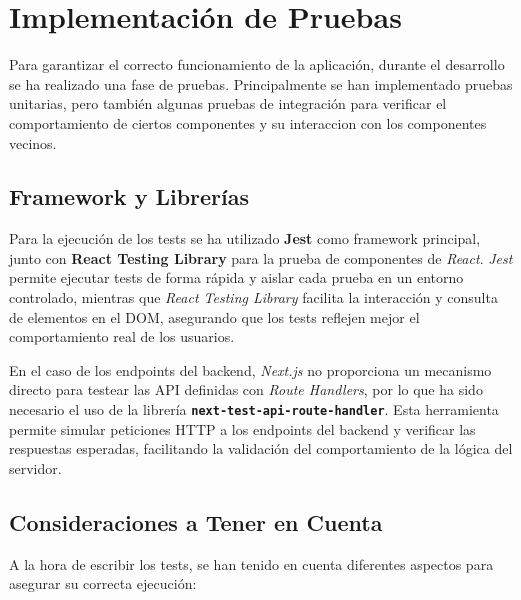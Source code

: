 \section{Implementación de Pruebas}

Para garantizar el correcto funcionamiento de la aplicación, durante el desarrollo se ha realizado una fase de pruebas. Principalmente se han implementado pruebas unitarias, pero también algunas pruebas de integración para verificar el comportamiento de ciertos componentes y su interaccion con los componentes vecinos.

\subsection{Framework y Librerías}

Para la ejecución de los tests se ha utilizado \textbf{Jest} como framework principal, junto con \textbf{React Testing Library} para la prueba de componentes de \textit{React}. \textit{Jest} permite ejecutar tests de forma rápida y aislar cada prueba en un entorno controlado, mientras que \textit{React Testing Library} facilita la interacción y consulta de elementos en el DOM, asegurando que los tests reflejen mejor el comportamiento real de los usuarios.

En el caso de los endpoints del backend, \textit{Next.js} no proporciona un mecanismo directo para testear las API definidas con \textit{Route Handlers}, por lo que ha sido necesario el uso de la librería \textbf{\texttt{next-test-api-route-handler}}. Esta herramienta permite simular peticiones HTTP a los endpoints del backend y verificar las respuestas esperadas, facilitando la validación del comportamiento de la lógica del servidor.

\subsection{Consideraciones a Tener en Cuenta}

A la hora de escribir los tests, se han tenido en cuenta diferentes aspectos para asegurar su correcta ejecución:


